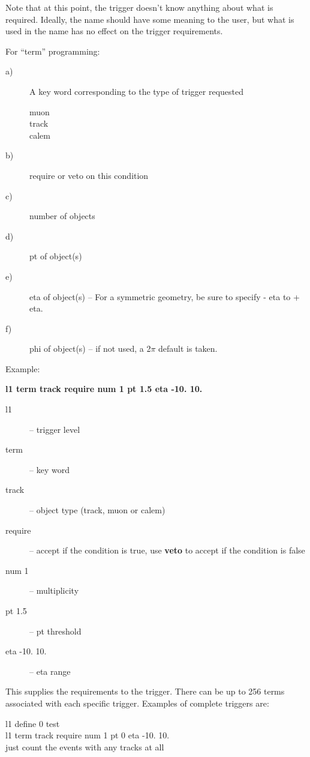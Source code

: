Note that at this point, the trigger doesn't know anything about what
is required.  Ideally, the name should have some meaning to the user, but
what is used in the name has no effect on the trigger requirements.

For ``term'' programming:
\begin{description}
 \item[a)] A key word corresponding to the type of trigger requested
 \begin{description}
  \item[ muon]
  \item[ track]
  \item[ calem]
 \end{description}
 \item[b)] require or veto on this condition
 \item[c)] number of objects
 \item[d)] pt of object(s)
 \item[e)] eta of object(s)  --  For a symmetric geometry, be sure to specify 
                         - eta to + eta.
 \item[f)] phi of object(s)  -- if not used, a 2$\pi$ default is taken. 
\end{description}

Example:

{\bf l1 term track require num 1 pt 1.5 eta -10. 10.}

\begin{description}
\item[ l1 ] -- trigger level
\item[ term ] -- key word
\item[ track ] -- object type (track, muon or calem)
\item[ require] -- accept if the condition is true, use {\bf veto} to accept if the condition is false
\item[ num 1 ] -- multiplicity
\item[ pt 1.5 ] -- pt threshold
\item[ eta -10. 10. ] -- eta range
\end{description}

This supplies the requirements to the trigger.  There can be up to 256
terms associated with each specific trigger.  Examples of complete 
triggers are:

l1 define 0 test \\
l1 term track require num 1 pt 0 eta -10. 10.\\
{just count the events with any tracks at all}\\

